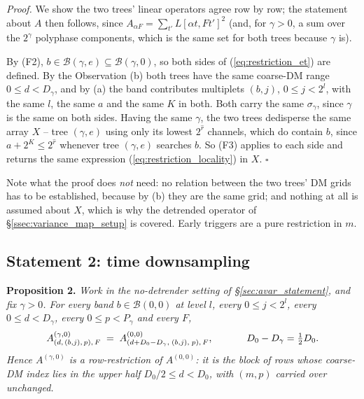 \documentclass{article}
\numberwithin{equation}{section}   %
\begin{document}
\medskip
\par\noindent
{\em Proof.} We show the two trees' linear operators agree row by row; the statement about
$A$ then follows, since $A_{\alpha F} = \sum_{t'} L[\alpha t, F t']^2$ (and, for $\gamma>0$, a
sum over the $2^\gamma$ polyphase components, which is the same set for both trees because
$\gamma$ is).

By (F2), $b \in \mathcal{B}(\gamma,e) \subseteq \mathcal{B}(\gamma,0)$, so both sides of
(\ref{eq:restriction_et}) are defined. By the Observation (b) both trees have the same
coarse-DM range $0 \le d < D_\gamma$, and by (a) the band contributes multiplets $(b,j)$,
$0 \le j < 2^l$, with the same $l$, the same $a$ and the same $K$ in both. Both carry the same
$\sigma_\gamma$, since $\gamma$ is the same on both sides. Having the same $\gamma$, the two
trees dedisperse the same array $X$ -- tree $(\gamma,e)$ using only its lowest $2^{\hat r}$
channels, which do contain $b$, since $a + 2^K \le 2^{\hat r}$ whenever tree $(\gamma,e)$
searches $b$. So (F3) applies to each side and returns the same expression
(\ref{eq:restriction_locality}) in $X$. $\square$

\medskip
\par\noindent
Note what the proof does {\em not} need: no relation between the two trees' DM grids has to be
established, because by (b) they are the same grid; and nothing at all is assumed about $X$,
which is why the detrended operator of \S\ref{ssec:variance_map_setup} is covered. Early
triggers are a pure restriction in $m$.

\subsection{Statement 2: time downsampling}
\label{ssec:restriction_ds}

\par\noindent
{\bf Proposition 2.} {\em Work in the no-detrender setting of \S\ref{sec:avar_statement}, and
fix $\gamma > 0$. For every band $b \in \mathcal{B}(0,0)$ at level $l$, every
$0 \le j < 2^l$, every $0 \le d < D_\gamma$, every $0 \le p < P_\gamma$ and every $F$,}
\begin{equation}
A^{(\gamma,0)}_{(d,\,(b,j),\,p),\,F} \;=\; A^{(0,0)}_{(d + D_0 - D_\gamma,\;(b,j),\;p),\,F},
\hspace{1.2cm} D_0 - D_\gamma = \tfrac{1}{2} D_0 .
\label{eq:restriction_ds}
\end{equation}
{\em Hence $A^{(\gamma,0)}$ is a row-restriction of $A^{(0,0)}$: it is the block of rows whose
coarse-DM index lies in the upper half $D_0/2 \le d < D_0$, with $(m,p)$ carried over
unchanged.}
\end{document}

